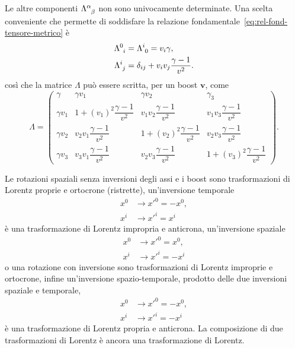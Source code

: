 Le altre componenti $\tensor{\Lambda}{^{\alpha}_{\beta}}$ non sono univocamente
determinate.  Una scelta conveniente che permette di soddisfare
la relazione fondamentale~\eqref{eq:rel-fond-tensore-metrico} è
\begin{subequations}
  \begin{align}
    \tensor{\Lambda}{^{0}_{i}} &= \tensor{\Lambda}{^{i}_{0}} = v_{i}\gamma, \\
    \tensor{\Lambda}{^{i}_{j}} &= \delta_{ij} +
    v_{i}v_{j}\frac{\gamma-1}{v^{2}}.
  \end{align}
\end{subequations}
così che la matrice $\Lambda$ può essere scritta, per un boost
$\bm{v}$, come
\begin{equation}
  \Lambda =
  \begin{pmatrix}
    \gamma & \gamma v_{1} & \gamma v_{2} & \gamma _{3} \\[2.0ex]
    \gamma v_{1} & 1 + (v_{1})^{2}\dfrac{\gamma-1}{v^{2}} &
    v_{1}v_{2}\dfrac{\gamma-1}{v^{2}} & v_{1} v_{3}\dfrac{\gamma-1}{v^{2}}
    \\[2.0ex]
    \gamma v_{2} & v_{2}v_{1}\dfrac{\gamma-1}{v^{2}} & 1 +
    (v_{2})^{2}\dfrac{\gamma-1}{v^{2}} & v_{2}v_{3}\dfrac{\gamma-1}{v^{2}}
    \\[2.0ex]
    \gamma v_{3} & v_{3}v_{1}\dfrac{\gamma-1}{v^{2}} &
    v_{2}v_{3}\dfrac{\gamma-1}{v^{2}} & 1 + (v_{3})^{2}\dfrac{\gamma-1}{v^{2}}
  \end{pmatrix}.
\end{equation}

Le rotazioni spaziali senza inversioni degli assi e i boost sono trasformazioni
di Lorentz proprie e ortocrone (ristrette), un'inversione temporale
\begin{subequations}
  \begin{align}
    x^{0} &\to x'^{0} = -x^{0}, \\
    x^{i} &\to x'^{i} = x^{i}
  \end{align}
\end{subequations}
è una trasformazione di Lorentz impropria e anticrona, un'inversione spaziale
\begin{subequations}
  \begin{align}
    x^{0} &\to x'^{0} = x^{0}, \\
    x^{i} &\to x'^{i} = - x^{i}
  \end{align}
\end{subequations}
o una rotazione con inversione sono trasformazioni di Lorentz improprie e
ortocrone, infine un'inversione spazio-temporale, prodotto delle due inversioni
spaziale e temporale,
\begin{subequations}
  \begin{align}
    x^{0} &\to x'^{0} = - x^{0}, \\
    x^{i} &\to x'^{i} = - x^{i}
  \end{align}
\end{subequations}
è una trasformazione di Lorentz propria e anticrona.  La composizione di due
trasformazioni di Lorentz è ancora una trasformazione di Lorentz.

